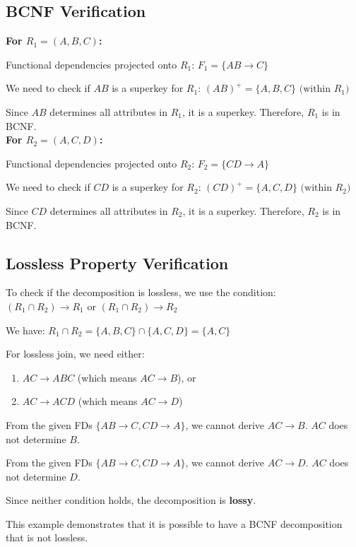 \documentclass[12pt,a4paper]{article}
\begin{document}
\subsection{BCNF Verification}

\textbf{For $R_1 = (A, B, C)$:}

Functional dependencies projected onto $R_1$:
$F_1 = \{AB \rightarrow C\}$

We need to check if $AB$ is a superkey for $R_1$:
$(AB)^+ = \{A, B, C\} \text{ (within } R_1 \text{)}$

Since $AB$ determines all attributes in $R_1$, it is a superkey. Therefore, $R_1$ is in BCNF.\\
\textbf{For $R_2 = (A, C, D)$:}

Functional dependencies projected onto $R_2$:
$F_2 = \{CD \rightarrow A\}$

We need to check if $CD$ is a superkey for $R_2$:
$(CD)^+ = \{A, C, D\} \text{ (within } R_2 \text{)}$

Since $CD$ determines all attributes in $R_2$, it is a superkey. Therefore, $R_2$ is in BCNF.

\subsection{Lossless Property Verification}

To check if the decomposition is lossless, we use the condition:
$(R_1 \cap R_2) \rightarrow R_1 \text{ or } (R_1 \cap R_2) \rightarrow R_2$

We have:
$R_1 \cap R_2 = \{A, B, C\} \cap \{A, C, D\} = \{A, C\}$

For lossless join, we need either:
\begin{enumerate}
    \item $AC \rightarrow ABC$ (which means $AC \rightarrow B$), or
    \item $AC \rightarrow ACD$ (which means $AC \rightarrow D$)
\end{enumerate}

From the given FDs $\{AB \rightarrow C, CD \rightarrow A\}$, we cannot derive $AC \rightarrow B$.
$AC$ does not determine $B$.

From the given FDs $\{AB \rightarrow C, CD \rightarrow A\}$, we cannot derive $AC \rightarrow D$.
$AC$ does not determine $D$.

Since neither condition holds, the decomposition is \textbf{lossy}.


This example demonstrates that it is possible to have a BCNF decomposition that is not lossless.
\end{document}
